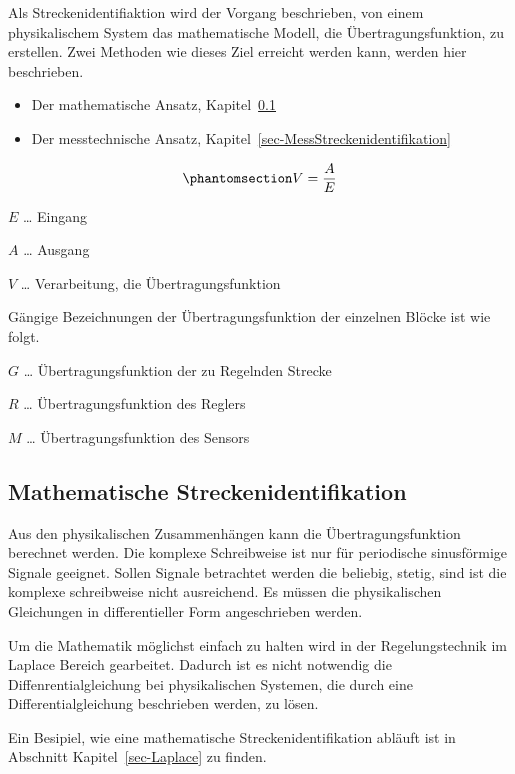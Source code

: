 \documentclass[
  letterpaper,
  DIV=11]{scrreprt}
\providecommand{\tightlist}{%
  \setlength{\itemsep}{0pt}\setlength{\parskip}{0pt}}\usepackage{longtable,booktabs,array}
\begin{document}
Als Streckenidentifiaktion wird der Vorgang beschrieben, von einem
physikalischem System das mathematische Modell, die
Übertragungsfunktion, zu erstellen. Zwei Methoden wie dieses Ziel
erreicht werden kann, werden hier beschrieben.

\begin{itemize}
\tightlist
\item
  Der mathematische Ansatz,
  Kapitel~\ref{sec-MathStreckenidentifikation}\\
\item
  Der messtechnische Ansatz,
  Kapitel~\ref{sec-MessStreckenidentifikation}
\end{itemize}

\begin{equation}\phantomsection\label{eq-EVA}{
V = \frac{A}{E}
}\end{equation}

\(E\) \ldots{} Eingang

\(A\) \ldots{} Ausgang

\(V\) \ldots{} Verarbeitung, die Übertragungsfunktion

Gängige Bezeichnungen der Übertragungsfunktion der einzelnen Blöcke ist
wie folgt.

\(G\) \ldots{} Übertragungsfunktion der zu Regelnden Strecke

\(R\) \ldots{} Übertragungsfunktion des Reglers

\(M\) \ldots{} Übertragungsfunktion des Sensors

\subsection{Mathematische
Streckenidentifikation}\label{sec-MathStreckenidentifikation}

Aus den physikalischen Zusammenhängen kann die Übertragungsfunktion
berechnet werden. Die komplexe Schreibweise ist nur für periodische
sinusförmige Signale geeignet. Sollen Signale betrachtet werden die
beliebig, stetig, sind ist die komplexe schreibweise nicht ausreichend.
Es müssen die physikalischen Gleichungen in differentieller Form
angeschrieben werden.

Um die Mathematik möglichst einfach zu halten wird in der
Regelungstechnik im Laplace Bereich gearbeitet. Dadurch ist es nicht
notwendig die Diffenrentialgleichung bei physikalischen Systemen, die
durch eine Differentialgleichung beschrieben werden, zu lösen.

Ein Besipiel, wie eine mathematische Streckenidentifikation abläuft ist
in Abschnitt Kapitel~\ref{sec-Laplace} zu finden.
\end{document}
